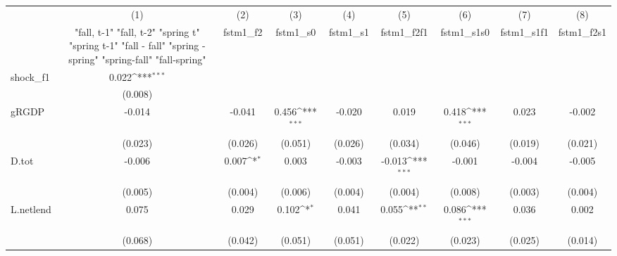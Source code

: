 {
\def\sym#1{\ifmmode^{#1}\else\(^{#1}\)\fi}
\begin{tabular}{l*{8}{c}}
\toprule
            &\multicolumn{1}{c}{(1)}&\multicolumn{1}{c}{(2)}&\multicolumn{1}{c}{(3)}&\multicolumn{1}{c}{(4)}&\multicolumn{1}{c}{(5)}&\multicolumn{1}{c}{(6)}&\multicolumn{1}{c}{(7)}&\multicolumn{1}{c}{(8)}\\
            &\multicolumn{1}{c}{  "fall, t-1" "fall, t-2" "spring t" "spring t-1"  "fall - fall" "spring - spring" "spring-fall" "fall-spring" }&\multicolumn{1}{c}{fstm1\_f2}&\multicolumn{1}{c}{fstm1\_s0}&\multicolumn{1}{c}{fstm1\_s1}&\multicolumn{1}{c}{fstm1\_f2f1}&\multicolumn{1}{c}{fstm1\_s1s0}&\multicolumn{1}{c}{fstm1\_s1f1}&\multicolumn{1}{c}{fstm1\_f2s1}\\
\midrule
shock\_f1    &       0.022\sym{***}&                     &                     &                     &                     &                     &                     &                     \\
            &     (0.008)         &                     &                     &                     &                     &                     &                     &                     \\
\addlinespace
gRGDP       &      -0.014         &      -0.041         &       0.456\sym{***}&      -0.020         &       0.019         &       0.418\sym{***}&       0.023         &      -0.002         \\
            &     (0.023)         &     (0.026)         &     (0.051)         &     (0.026)         &     (0.034)         &     (0.046)         &     (0.019)         &     (0.021)         \\
\addlinespace
D.tot       &      -0.006         &       0.007\sym{*}  &       0.003         &      -0.003         &      -0.013\sym{***}&      -0.001         &      -0.004         &      -0.005         \\
            &     (0.005)         &     (0.004)         &     (0.006)         &     (0.004)         &     (0.004)         &     (0.008)         &     (0.003)         &     (0.004)         \\
\addlinespace
L.netlend   &       0.075         &       0.029         &       0.102\sym{*}  &       0.041         &       0.055\sym{**} &       0.086\sym{***}&       0.036         &       0.002         \\
            &     (0.068)         &     (0.042)         &     (0.051)         &     (0.051)         &     (0.022)         &     (0.023)         &     (0.025)         &     (0.014)         \\

\end{tabular}}
